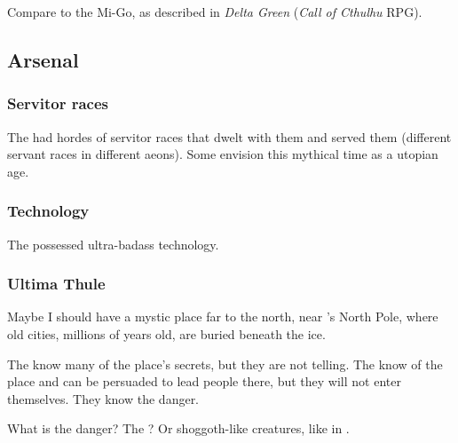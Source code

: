 Compare to the Mi-Go, as described in \emph{Delta Green} (\emph{Call of Cthulhu} RPG). 









\subsection{Arsenal}





\subsubsection{Servitor races}
The \voyagers{} had hordes of servitor races that dwelt with them and served them (different servant races in different aeons). Some envision this mythical time as a utopian age. 





\subsubsection{Technology}
The \voyagers{} possessed ultra-badass technology.





\subsubsection{Ultima Thule}
Maybe I should have a mystic place far to the north, near \Miith{}'s North Pole, where old \voyager{} cities, millions of years old, are buried beneath the ice. 

The \nagalords{} know many of the place's secrets, but they are not telling. 
The \nagae{} know of the place and can be persuaded to lead people there, but they will not enter themselves. They know the danger. 

What is the danger? The \bladedpeople? Or shoggoth-like creatures, like in .


